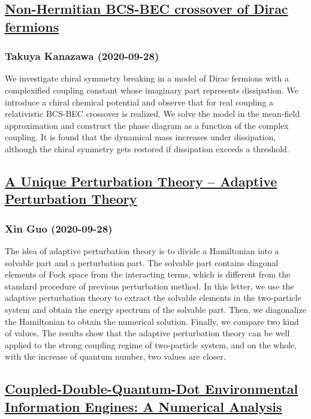 \subsection*{\href{http://arxiv.org/abs/2009.13363v1}{Non-Hermitian BCS-BEC crossover of Dirac fermions}}
\subsubsection*{Takuya Kanazawa (2020-09-28)}
We investigate chiral symmetry breaking in a model of Dirac fermions with a
complexified coupling constant whose imaginary part represents dissipation. We
introduce a chiral chemical potential and observe that for real coupling a
relativistic BCS-BEC crossover is realized. We solve the model in the
mean-field approximation and construct the phase diagram as a function of the
complex coupling. It is found that the dynamical mass increases under
dissipation, although the chiral symmetry gets restored if dissipation exceeds
a threshold.

\subsection*{\href{http://arxiv.org/abs/2009.13362v1}{A Unique Perturbation Theory -- Adaptive Perturbation Theory}}
\subsubsection*{Xin Guo (2020-09-28)}
The idea of adaptive perturbation theory is to divide a Hamiltonian into a
solvable part and a perturbation part. The solvable part contains diagonal
elements of Fock space from the interacting terms, which is different from the
standard procedure of previous perturbation method. In this letter, we use the
adaptive perturbation theory to extract the solvable elements in the
two-particle system and obtain the energy spectrum of the solvable part. Then,
we diagonalize the Hamiltonian to obtain the numerical solution. Finally, we
compare two kind of values. The results show that the adaptive perturbation
theory can be well applied to the strong coupling regime of two-particle
system, and on the whole, with the increase of quantum number, two values are
closer.

\subsection*{\href{http://arxiv.org/abs/2009.13361v1}{Coupled-Double-Quantum-Dot Environmental Information Engines: A  Numerical Analysis}}
